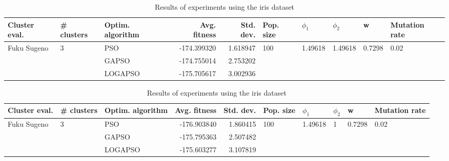 \documentclass{article}
\begin{document}
\begin{table}
\centering
\caption{Results of experiments using the iris dataset}
\begin{tabular}{lllrrlllll}
\toprule
               Cluster eval. &        \# clusters & Optim. algorithm &  Avg. fitness &  Std. dev. &            Pop. size &               $\phi_{1}$ &               $\phi_{2}$ &                       w &         Mutation rate \\
\midrule
\multirow{3}{*}{Fuku Sugeno} & \multirow{3}{*}{3} &              PSO &   -174.399320 &   1.618947 & \multirow{3}{*}{100} & \multirow{3}{*}{1.49618} & \multirow{3}{*}{1.49618} & \multirow{3}{*}{0.7298} & \multirow{3}{*}{0.02} \\
                             &                    &            GAPSO &   -174.755014 &   2.753202 &                      &                          &                          &                         &                       \\
                             &                    &          LOGAPSO &   -175.705617 &   3.002936 &                      &                          &                          &                         &                       \\
\bottomrule
\end{tabular}
\end{table}
\begin{table}
\centering
\caption{Results of experiments using the iris dataset}
\begin{tabular}{lllrrlllll}
\toprule
               Cluster eval. &        \# clusters & Optim. algorithm &  Avg. fitness &  Std. dev. &            Pop. size &               $\phi_{1}$ &         $\phi_{2}$ &                       w &         Mutation rate \\
\midrule
\multirow{3}{*}{Fuku Sugeno} & \multirow{3}{*}{3} &              PSO &   -176.903840 &   1.860415 & \multirow{3}{*}{100} & \multirow{3}{*}{1.49618} & \multirow{3}{*}{1} & \multirow{3}{*}{0.7298} & \multirow{3}{*}{0.02} \\
                             &                    &            GAPSO &   -175.795363 &   2.507482 &                      &                          &                    &                         &                       \\
                             &                    &          LOGAPSO &   -175.603277 &   3.107819 &                      &                          &                    &                         &                       \\
\bottomrule
\end{tabular}
\end{table}
\end{document}
